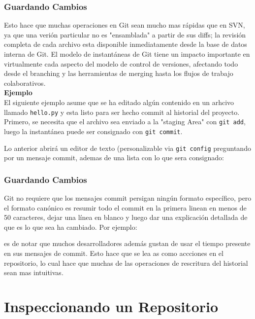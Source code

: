 \documentclass[8pt]{beamer}
\begin{document}
\begin{frame}
\frametitle{Guardando Cambios}
Esto hace que muchas operaciones en Git sean mucho mas r\'apidas que en SVN, ya que una veri\'on particular no es "ensamblada" a partir de sus diffs; la revisi\'on completa de cada archivo esta disponible inmediatamente desde la base de datos interna de Git. El modelo de instant\'aneas de Git tiene un impacto importante en virtualmente cada aspecto del  modelo de control de versiones, afectando todo desde el branching y las herramientas de merging hasta los flujos de trabajo colaborativos.\\
\medskip
\textbf{Ejemplo}\\
\medskip
El siguiente ejemplo asume que se ha editado alg\'un contenido en un arhcivo llamado \texttt{hello.py} y esta listo para ser hecho commit al historial del proyecto. Primero, se necesita que el archivo sea enviado a la "staging Area" con \texttt{git add}, luego la instant\'anea puede ser consignado con \texttt{git commit}.

Lo anterior abrir\'a un editor de texto (personalizable via \texttt{git config} preguntando por un mensaje commit, ademas de una lista con lo que sera consignado:

\end{frame}

\begin{frame}
\frametitle{Guardando Cambios}
Git no requiere que los mensajes commit persigan ning\'un formato espec\'ifico, pero el formato can\'onico es resumir todo el commit en la primera linean en menos de 50 caracteres, dejar una l\'inea en blanco y luego dar una explicaci\'on detallada de que es lo que sea ha cambiado. Por ejemplo:

es de notar que muchos desarrolladores adem\'as gustan de usar el tiempo presente en sus mensajes de commit. Esto hace que se lea as como accciones en el repositorio, lo cual hace que muchas de las operaciones de rescritura del historial sean mas intuitivas.
\end{frame}
\section{Inspeccionando un Repositorio}
\end{document}
